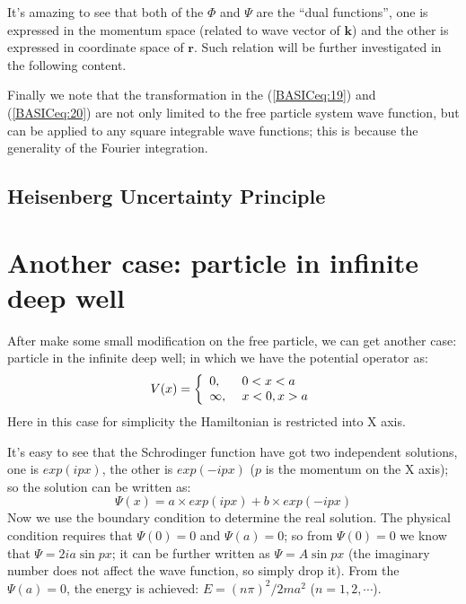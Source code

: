 It's amazing to see that both of the $\Phi$ and $\Psi$ are the ``dual
functions'', one is expressed in the momentum space (related to wave
vector of $\bm{k}$) and the other is expressed in coordinate space of
$\bm{r}$. Such relation will be further investigated in the following
content.

Finally we note that the transformation in the (\ref{BASICeq:19}) and
(\ref{BASICeq:20}) are not only limited to the free particle system
wave function, but can be applied to any square integrable wave
functions; this is because the generality of the Fourier integration.


\subsection{Heisenberg Uncertainty Principle}
\label{sec:HUP_in_basic}
%
%



\section{Another case: particle in infinite deep well}
\label{ASPIIDW_in_basic}
%
%
%
%
After make some small modification on the free particle, we can get
another case: particle in the infinite deep well; in which we have
the potential operator as:
\begin{equation}\label{}
 V(x) = \left\{
  \begin{array}{ll}
    0,      & \hbox{ $0 < x < a$} \\
    \infty, & \hbox{ $x<0, x>a$}
  \end{array}
\right.
\end{equation}
Here in this case for simplicity the Hamiltonian is restricted into X
axis.

It's easy to see that the Schrodinger function have got two
independent solutions, one is $exp(ipx)$, the other is $exp(-ipx)$ ($p
$ is the momentum on the X axis); so the solution can be written as:
\begin{equation}\label{}
  \Psi(x) = a \times exp(ipx) + b
\times exp(-ipx)
\end{equation}
Now we use the boundary condition to determine the real solution.  The
physical condition requires that $\Psi(0)=0$ and $\Psi(a)=0$; so from
$\Psi(0)=0$ we know that $\Psi = 2ia \sin px$; it can be further
written as $\Psi = A \sin px$ (the imaginary number does not affect the
wave function, so simply drop it). From the $\Psi(a)=0$, the energy is
achieved: $E = (n\pi)^{2}/2ma^{2}$ ($n=1,2,\cdots$).

